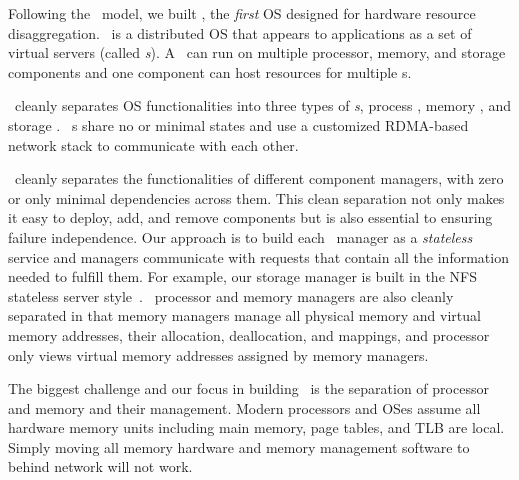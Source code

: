 \documentclass[10pt,times,twocolumn]{z2-article}
\begin{document}
Following the \splitkernel\ model, 
we built \lego, the {\em first} OS designed for hardware resource disaggregation.
\lego\ is a distributed OS that appears to applications as a set of virtual servers (called {\em \vnode{}s}).
A \vnode\ can run on multiple processor, memory, and storage components
and one component can host resources for multiple \vnode{}s.

\lego\ cleanly separates OS functionalities into %
three types of {\em \microos{}s},
process \microos, memory \microos, and storage \microos. %
\lego\ \microos{}s share no or minimal states
and use a customized RDMA-based network stack to communicate with each other.

\lego\ cleanly separates the functionalities of different component managers,
with zero or only minimal dependencies across them. 
This clean separation not only makes it easy to deploy, add, and remove components
but is also essential to ensuring failure independence. 
Our approach is to build each \lego\ manager as a {\em stateless}
service and managers communicate with requests that contain all the information needed to fulfill them.
For example, our storage manager is built in the NFS stateless server style~\cite{sun-nfs}.
\lego\ processor and memory managers are also cleanly separated 
in that memory managers manage all physical memory and virtual memory addresses, their allocation, deallocation, and mappings,
and processor only views virtual memory addresses assigned by memory managers. 
\fi

The biggest challenge and our focus in building \lego\ is the separation of processor and memory and their management.
Modern processors and OSes assume all hardware memory units including main memory, page tables, and TLB are local.
Simply moving all memory hardware and memory management software to behind network will not work.
\end{document}
